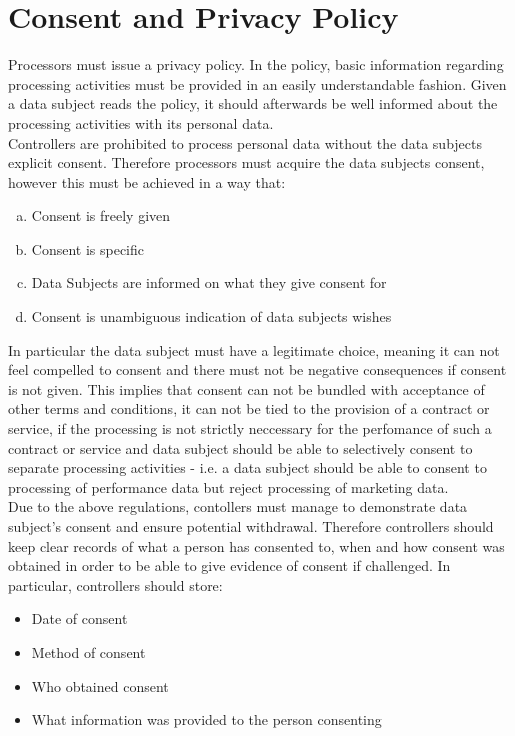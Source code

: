 \documentclass[a4paper,12pt]{report}
\begin{document}
	\section{Consent and Privacy Policy}
	\startsection
	Processors must issue a privacy policy.
	In the policy, basic information regarding processing activities must be provided in an easily understandable fashion.
	Given a data subject reads the policy, it should afterwards be well informed about the processing activities with its personal data.\\
	Controllers are prohibited to process personal data without the data subjects explicit consent.
	Therefore processors must acquire the data subjects consent, however this must be achieved in a way that:
	\begin{enumerate}[a)]
		\item Consent is freely given
		\item Consent is specific
		\item Data Subjects are informed on what they give consent for
		\item Consent is unambiguous indication of data subjects wishes
	\end{enumerate}
	In particular the data subject must have a legitimate choice, meaning it can not feel compelled to consent and there must not be negative consequences if consent is not given.
	This implies that consent can not be bundled with acceptance of other terms and conditions, 
	it can not be tied to the provision of a contract or service, if the processing is not strictly neccessary for the perfomance of such a contract or service and
	data subject should be able to selectively consent to separate processing activities - i.e. a data subject should be able to consent to processing of performance data but reject processing of marketing data.\\
	Due to the above regulations, contollers must manage to demonstrate data subject's consent and ensure potential withdrawal.
	Therefore controllers should keep clear records of what a person has consented to, when and how consent was obtained in order to be able to give evidence of consent if challenged. 
	In particular, controllers should store:
	\begin{itemize}
		\item Date of consent
		\item Method of consent
		\item Who obtained consent
		\item What information was provided to the person consenting
	\end{itemize}
\end{document}
